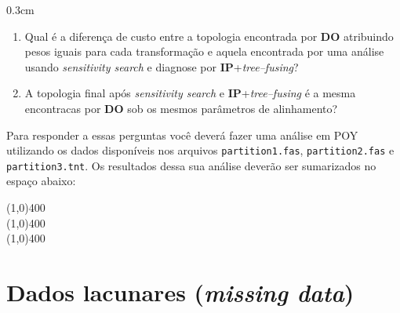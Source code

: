 \begin{refsection}
\begin {myindentpar}{0.3cm}
\begin{enumerate}[\itshape i.]

	\item{Qual é a diferença de custo entre a topologia encontrada por \textbf{DO} atribuindo pesos iguais para cada transformação e aquela encontrada por uma análise usando  \textit{sensitivity search} e diagnose por \textbf{IP}+\textit{tree--fusing}?}

	\item{A topologia final após \textit{sensitivity search} e \textbf{IP}+\textit{tree--fusing} é a mesma encontracas por \textbf{DO} sob os mesmos parâmetros de alinhamento?}

\end{enumerate}
\end{myindentpar}

	Para responder a essas perguntas você deverá fazer uma análise em POY utilizando os dados disponíveis nos arquivos \texttt{partition1.fas}, \texttt{partition2.fas} e \texttt{partition3.tnt}. Os resultados dessa sua análise deverão ser sumarizados no espaço abaixo:

\begin{center}
\line(1,0){400}\\
\line(1,0){400}\\
\line(1,0){400}\\
\end{center}

\section{Dados lacunares (\textit{missing data})}\label{tut11:missing}


\end{refsection}
